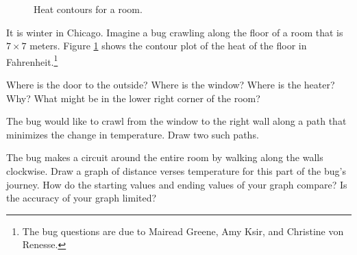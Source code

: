 \begin{figure}[h!]
\begin{center}
		\end{center}
		\vspace{-.5cm}
		\caption{Heat contours for a room.}
		\label{heatcontour1}
	\end{figure}

\begin{question}
	It is winter in Chicago.  Imagine a bug crawling along the floor of
	a room that is $7\times 7$ meters.  Figure \ref{heatcontour1} shows the contour plot of the heat
	of the floor in Fahrenheit.\footnote{The bug questions are due to Mairead Greene, Amy Ksir, and Christine von Renesse.}
	\begin{parts}
		\item Where is the door to the outside?  Where is the window?  Where is the heater? Why?
			What might be in the lower right corner of the room?
		\item The bug would like to crawl from the window to the right wall along a path that minimizes
			the change in temperature.  Draw two such paths.
		\item The bug makes a circuit around the entire room by walking along the walls clockwise.
			Draw a graph of distance verses temperature for this part of the bug's journey.  How
			do the starting values and ending values of your graph compare?  Is the accuracy of your
			graph limited?
	\end{parts}
\end{question}

